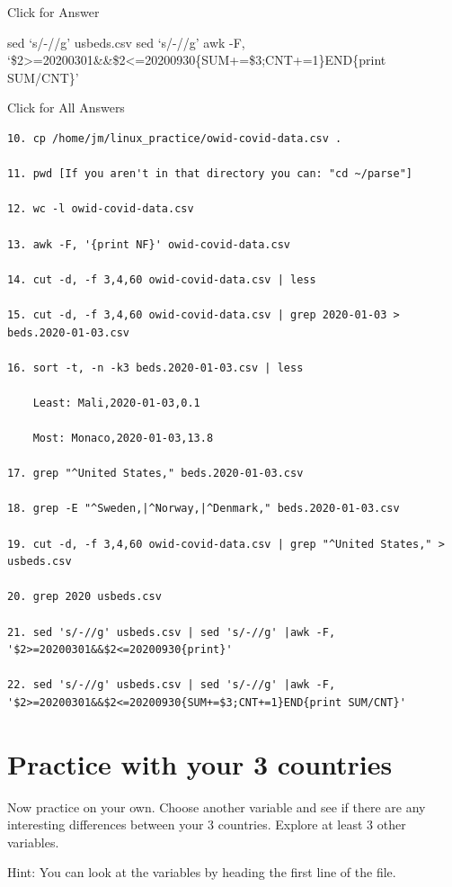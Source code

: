 \documentclass[
]{book}
\begin{document}
Click for Answer

sed `s/-//g' usbeds.csv \textbar{} sed `s/-//g' \textbar awk -F, `\$2\textgreater=20200301\&\&\$2\textless=20200930\{SUM+=\$3;CNT+=1\}END\{print SUM/CNT\}'

\hfill\break

Click for All Answers

\begin{verbatim}
10. cp /home/jm/linux_practice/owid-covid-data.csv . 

11. pwd [If you aren't in that directory you can: "cd ~/parse"]

12. wc -l owid-covid-data.csv

13. awk -F, '{print NF}' owid-covid-data.csv

14. cut -d, -f 3,4,60 owid-covid-data.csv | less

15. cut -d, -f 3,4,60 owid-covid-data.csv | grep 2020-01-03 > beds.2020-01-03.csv

16. sort -t, -n -k3 beds.2020-01-03.csv | less

    Least: Mali,2020-01-03,0.1
    
    Most: Monaco,2020-01-03,13.8

17. grep "^United States," beds.2020-01-03.csv

18. grep -E "^Sweden,|^Norway,|^Denmark," beds.2020-01-03.csv

19. cut -d, -f 3,4,60 owid-covid-data.csv | grep "^United States," > usbeds.csv

20. grep 2020 usbeds.csv

21. sed 's/-//g' usbeds.csv | sed 's/-//g' |awk -F, '$2>=20200301&&$2<=20200930{print}'

22. sed 's/-//g' usbeds.csv | sed 's/-//g' |awk -F, '$2>=20200301&&$2<=20200930{SUM+=$3;CNT+=1}END{print SUM/CNT}'

\end{verbatim}

\hypertarget{practice-with-your-3-countries}{%
\section{Practice with your 3 countries}\label{practice-with-your-3-countries}}

Now practice on your own. Choose another variable and see if there are any interesting differences between your 3 countries. Explore at least 3 other variables.

Hint: You can look at the variables by heading the first line of the file.
\end{document}
